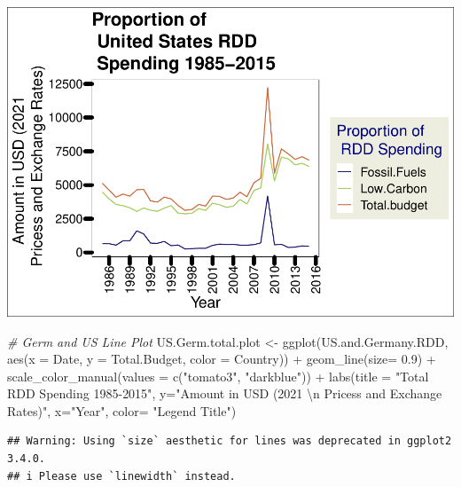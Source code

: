 \documentclass[
  12pt,
]{article}
\newenvironment{Shaded}{\begin{snugshade}}{\end{snugshade}}
\newcommand{\AttributeTok}[1]{\textcolor[rgb]{0.77,0.63,0.00}{#1}}
\newcommand{\CommentTok}[1]{\textcolor[rgb]{0.56,0.35,0.01}{\textit{#1}}}
\newcommand{\FloatTok}[1]{\textcolor[rgb]{0.00,0.00,0.81}{#1}}
\newcommand{\FunctionTok}[1]{\textcolor[rgb]{0.00,0.00,0.00}{#1}}
\newcommand{\NormalTok}[1]{#1}
\newcommand{\OtherTok}[1]{\textcolor[rgb]{0.56,0.35,0.01}{#1}}
\newcommand{\SpecialCharTok}[1]{\textcolor[rgb]{0.00,0.00,0.00}{#1}}
\newcommand{\StringTok}[1]{\textcolor[rgb]{0.31,0.60,0.02}{#1}}
\begin{document}
\includegraphics{Chang_Jenkins_Mullens_ENV872_Final_files/figure-latex/unnamed-chunk-1-2.pdf}

\begin{Shaded}
\begin{Highlighting}[]
\CommentTok{\# Germ and US Line Plot}
\NormalTok{US.Germ.total.plot }\OtherTok{\textless{}{-}} \FunctionTok{ggplot}\NormalTok{(US.and.Germany.RDD,}
                              \FunctionTok{aes}\NormalTok{(}\AttributeTok{x =}\NormalTok{ Date,}
                                  \AttributeTok{y =}\NormalTok{ Total.Budget, }
                                  \AttributeTok{color =}\NormalTok{ Country)) }\SpecialCharTok{+} 
  \FunctionTok{geom\_line}\NormalTok{(}\AttributeTok{size=} \FloatTok{0.9}\NormalTok{) }\SpecialCharTok{+}
  \FunctionTok{scale\_color\_manual}\NormalTok{(}\AttributeTok{values =} \FunctionTok{c}\NormalTok{(}\StringTok{"tomato3"}\NormalTok{, }\StringTok{"darkblue"}\NormalTok{)) }\SpecialCharTok{+}
  \FunctionTok{labs}\NormalTok{(}\AttributeTok{title =} \StringTok{"Total RDD Spending 1985{-}2015"}\NormalTok{,}
       \AttributeTok{y=}\StringTok{"Amount in USD (2021 }\SpecialCharTok{\textbackslash{}n}\StringTok{ Pricess and Exchange Rates)"}\NormalTok{,}
       \AttributeTok{x=}\StringTok{"Year"}\NormalTok{,}
       \AttributeTok{color=} \StringTok{"Legend Title"}\NormalTok{)}
\end{Highlighting}
\end{Shaded}

\begin{verbatim}
## Warning: Using `size` aesthetic for lines was deprecated in ggplot2 3.4.0.
## i Please use `linewidth` instead.
\end{verbatim}
\end{document}
